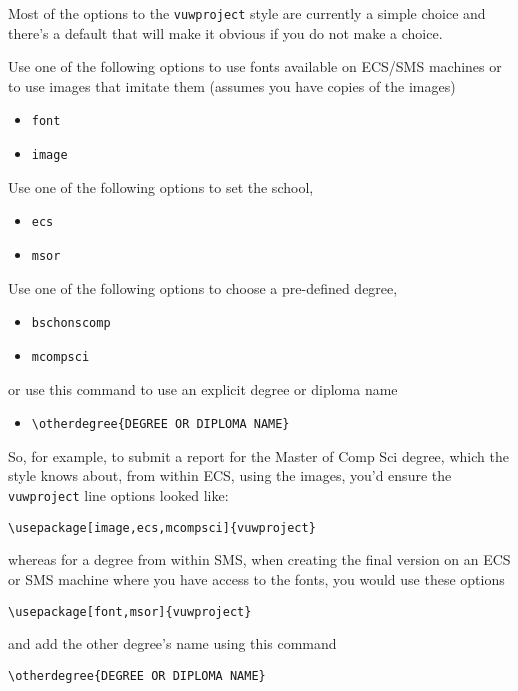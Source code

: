 Most of the options to the \texttt{vuwproject} style are currently a simple
choice and there's a default that will make it obvious if you do not make
a choice.

Use one of the following options to use fonts available on ECS/SMS machines
or to use images that imitate them (assumes you have copies of the images)
\begin{itemize}
\item \verb+font+
\item \verb+image+
\end{itemize}

Use one of the following options to set the school,
\begin{itemize}
\item \verb+ecs+
\item \verb+msor+
\end{itemize}

Use one of the following options to choose a pre-defined degree,
\begin{itemize}
\item \verb+bschonscomp+
\item \verb+mcompsci+
\end{itemize}

or use this command to use an explicit degree or diploma name
\begin{itemize}
\item \verb+\otherdegree{DEGREE OR DIPLOMA NAME}+
\end{itemize}

So, for example, to submit a report for the Master of Comp Sci degree, which
the style knows about, from within ECS, using the images, you'd ensure the
 \texttt{vuwproject} line options looked like:

\begin{verbatim}
\usepackage[image,ecs,mcompsci]{vuwproject}
\end{verbatim}

whereas for a degree from within SMS, when creating the final version on
an ECS or SMS machine where you have access to the fonts, you would use
these options

\begin{verbatim}
\usepackage[font,msor]{vuwproject}
\end{verbatim}


and add the other degree's name using this command 

\begin{verbatim}
\otherdegree{DEGREE OR DIPLOMA NAME}
\end{verbatim}


